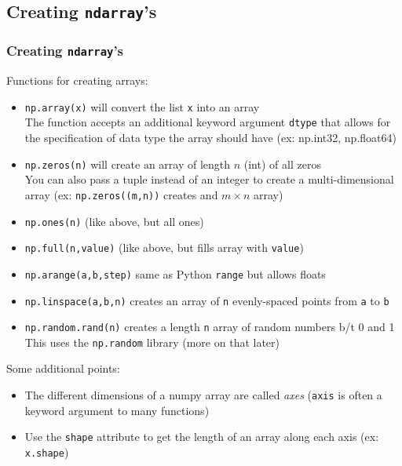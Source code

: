 \documentclass{beamer}
\newcommand{\code}[1]{\texttt{#1}}
\begin{document}
\subsection{Creating \code{ndarray}'s}

\begin{frame}	
	\frametitle{Creating \code{ndarray}'s}
	
	\begin{block}{Functions for creating arrays:}
		\begin{scriptsize}
		
		\begin{itemize}
			\item \code{np.array(x)} will convert the list \code{x} into an array \\
					The function accepts an additional keyword argument \code{dtype} that allows for the specification of data type the array should have (ex: np.int32, np.float64)
			\item \code{np.zeros(n)} will create an array of length $n$ (int) of all zeros \\
					You can also pass a tuple instead of an integer to create a multi-dimensional array (ex: \code{np.zeros((m,n))} creates and $m\times n$ array)
			\item \code{np.ones(n)} (like above, but all ones)
			\item \code{np.full(n,value)} (like above, but fills array with \code{value})
			\item \code{np.arange(a,b,step)} same as Python \code{range} but allows floats
			\item \code{np.linspace(a,b,n)} creates an array of \code{n} evenly-spaced points from \code{a} to \code{b}
			\item \code{np.random.rand(n)} creates a length \code{n} array of random numbers b/t 0 and 1 \\
					This uses the \code{np.random} library (more on that later)
		\end{itemize}
		Some additional points:
		\begin{itemize}
			\item The different dimensions of a numpy array are called \emph{axes} (\code{axis} is often a keyword argument to many functions)
			\item Use the \code{shape} attribute to get the length of an array along each axis (ex: \code{x.shape})
		\end{itemize}
		
		\end{scriptsize}
	\end{block}
	
\end{frame}
\end{document}
